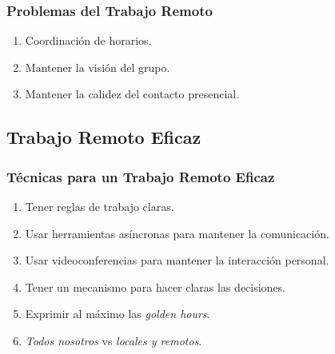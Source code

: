 \documentclass[handout,a4paper,t,xcolor=pst,dvips]{beamer}
\begin{document}
\begin{frame}[c]
	\frametitle{Problemas del Trabajo Remoto}
	\begin{enumerate}[<+->]
        \item Coordinación de horarios.
        \item Mantener la visión del grupo.
        \item Mantener la calidez del contacto presencial.
	\end{enumerate}
\end{frame}

\subsection{Trabajo Remoto Eficaz}

\begin{frame}[c]
	\frametitle{Técnicas para un Trabajo Remoto Eficaz}
	\begin{enumerate}[<+->]
        \item Tener reglas de trabajo claras.
        \item Usar herramientas asíncronas para mantener la comunicación.
        \item Usar videoconferencias para mantener la interacción personal.
        \item Tener un mecanismo para hacer claras las decisiones.
        \item Exprimir al máximo las \emph{golden hours}.
        \item \emph{Todos nosotros} vs \emph{locales y remotos}.
	\end{enumerate}
\end{frame}

\end{document}
